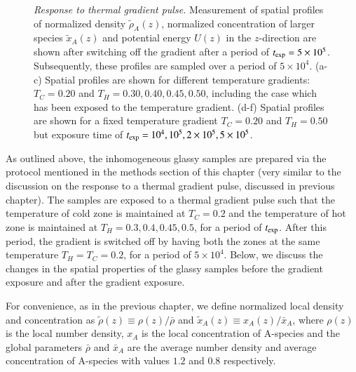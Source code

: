 \begin{figure}[hbt!]
\caption[{\em Thermal processing: applying thermal gradient to prepare inhomogeneous glassy samples}]{{\em Response to thermal gradient pulse.} Measurement of spatial profiles of normalized density $\tilde{\rho}_A(z)$,  normalized concentration of larger species $\tilde{x}_A(z)$ and potential energy $U(z)$ in the $z$-direction are shown after switching off the gradient after a period of $t_{\rm exp} = 5\times10^5$. Subsequently, these profiles are sampled over a period of $5\times10^4$. (a-c) Spatial profiles are shown for different temperature gradients: $T_C = 0.20$ and $T_H = 0.30, 0.40, 0.45, 0.50$, including the case which has been exposed to the temperature gradient. (d-f) Spatial profiles are shown for a fixed temperature gradient $T_C = 0.20$ and $T_H = 0.50$ but exposure time of $t_{\rm exp} = 10^4, 10^5, 2\times10^5, 5\times10^5$.}
\label{thermal}
\end{figure}

As outlined above, the inhomogeneous glassy samples are prepared via the protocol mentioned in the methods section of this chapter (very similar to the discussion on the response to a thermal gradient pulse, discussed in previous chapter). The samples are exposed to a thermal gradient pulse such that the temperature of cold zone is maintained at $T_C = 0.2$ and the temperature of hot zone is maintained at $T_H = 0.3,0.4, 0.45, 0.5$, for a period of $t_{\rm exp}$. After this period, the gradient is switched off by having both the zones at the same temperature $T_H = T_C = 0.2$, for a period of $5 \times 10^4$. Below, we discuss the changes in the spatial properties of the glassy samples before the gradient exposure and after the gradient exposure. 
 
 For convenience, as in the previous chapter, we define normalized local density and concentration as $\tilde{\rho}(z)\equiv\rho(z)/\bar{\rho}$ and $\tilde{x}_A(z)\equiv x_A(z)/\bar{x}_A$, where $\rho(z)$ is the local number density, $x_A$ is the local concentration of A-species and the global parameters $\bar{\rho}$ and $\bar{x}_A$ are the average number density and average concentration of A-species with values $1.2$ and $0.8$ respectively. 
 
